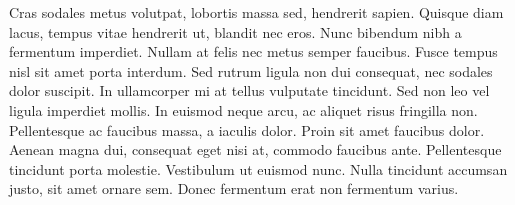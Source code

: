 Cras sodales metus volutpat, lobortis massa sed, hendrerit sapien. Quisque diam lacus, tempus vitae hendrerit ut, blandit nec eros. Nunc bibendum nibh a fermentum imperdiet. Nullam at felis nec metus semper faucibus. Fusce tempus nisl sit amet porta interdum. Sed rutrum ligula non dui consequat, nec sodales dolor suscipit. In ullamcorper mi at tellus vulputate tincidunt. Sed non leo vel ligula imperdiet mollis. In euismod neque arcu, ac aliquet risus fringilla non. Pellentesque ac faucibus massa, a iaculis dolor. Proin sit amet faucibus dolor. Aenean magna dui, consequat eget nisi at, commodo faucibus ante. Pellentesque tincidunt porta molestie. Vestibulum ut euismod nunc. Nulla tincidunt accumsan justo, sit amet ornare sem. Donec fermentum erat non fermentum varius.